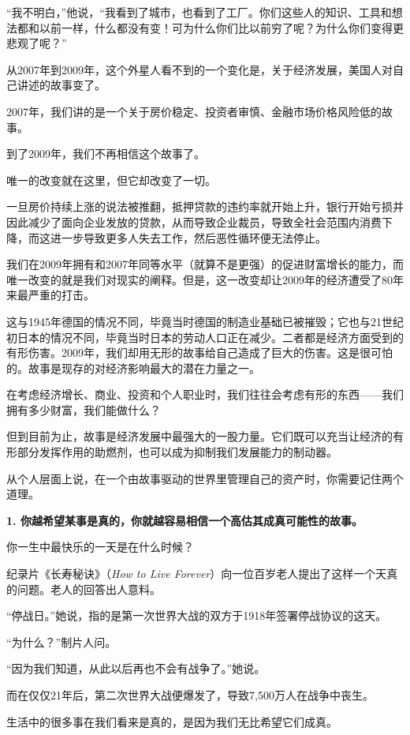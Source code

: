 “我不明白，”他说，“我看到了城市，也看到了工厂。你们这些人的知识、工具和想法都和以前一样，什么都没有变！可为什么你们比以前穷了呢？为什么你们变得更悲观了呢？”

从2007年到2009年，这个外星人看不到的一个变化是，关于经济发展，美国人对自己讲述的故事变了。

2007年，我们讲的是一个关于房价稳定、投资者审慎、金融市场价格风险低的故事。

到了2009年，我们不再相信这个故事了。

唯一的改变就在这里，但它却改变了一切。

一旦房价持续上涨的说法被推翻，抵押贷款的违约率就开始上升，银行开始亏损并因此减少了面向企业发放的贷款，从而导致企业裁员，导致全社会范围内消费下降，而这进一步导致更多人失去工作，然后恶性循环便无法停止。

我们在2009年拥有和2007年同等水平（就算不是更强）的促进财富增长的能力，而唯一改变的就是我们对现实的阐释。但是，这一改变却让2009年的经济遭受了80年来最严重的打击。

这与1945年德国的情况不同，毕竟当时德国的制造业基础已被摧毁；它也与21世纪初日本的情况不同，毕竟当时日本的劳动人口正在减少。二者都是经济方面受到的有形伤害。2009年，我们却用无形的故事给自己造成了巨大的伤害。这是很可怕的。故事是现存的对经济影响最大的潜在力量之一。

在考虑经济增长、商业、投资和个人职业时，我们往往会考虑有形的东西——我们拥有多少财富，我们能做什么？

但到目前为止，故事是经济发展中最强大的一股力量。它们既可以充当让经济的有形部分发挥作用的助燃剂，也可以成为抑制我们发展能力的制动器。

从个人层面上说，在一个由故事驱动的世界里管理自己的资产时，你需要记住两个道理。

\textbf{1. 你越希望某事是真的，你就越容易相信一个高估其成真可能性的故事。}

你一生中最快乐的一天是在什么时候？

纪录片《长寿秘诀》（\textit{How to Live Forever}）向一位百岁老人提出了这样一个天真的问题。老人的回答出人意料。

“停战日。”她说，指的是第一次世界大战的双方于1918年签署停战协议的这天。

“为什么？”制片人问。

“因为我们知道，从此以后再也不会有战争了。”她说。

而在仅仅21年后，第二次世界大战便爆发了，导致7,500万人在战争中丧生。

生活中的很多事在我们看来是真的，是因为我们无比希望它们成真。

